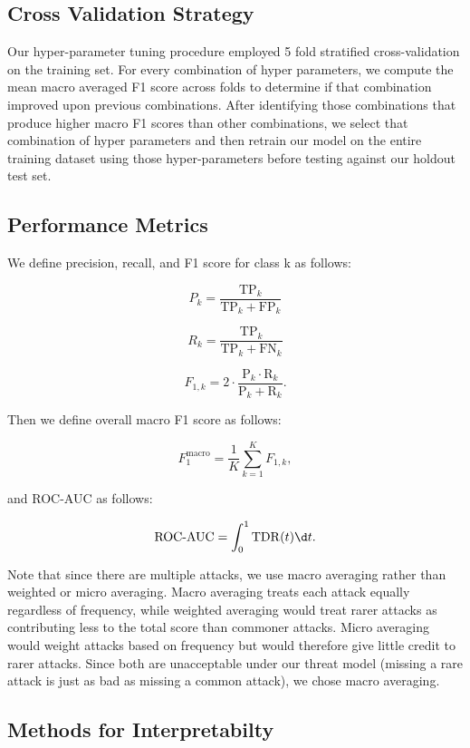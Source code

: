 \subsection{Cross Validation Strategy}

Our hyper-parameter tuning procedure employed 5 fold stratified cross-validation on the training set. For every combination of hyper parameters, we compute the mean macro averaged F1 score across folds to determine if that combination improved upon previous combinations. After identifying those combinations that produce higher macro F1 scores than other combinations, we select that combination of hyper parameters and then retrain our model on the entire training dataset using those hyper-parameters before testing against our holdout test set.

\subsection{Performance Metrics}

We define precision, recall, and F1 score for class k as follows:

$$ P_k = \frac{\mathrm{TP}_k}{\mathrm{TP}_k+\mathrm{FP}_k} $$

$$ R_k = \frac{\mathrm{TP}_k}{\mathrm{TP}_k+\mathrm{FN}_k} $$

$$ F_{1,k}= 2\cdot \frac{\mathrm{P}_k \cdot \mathrm{R}_k}{\mathrm{P}_k + \mathrm{R}_k}. $$

Then we define overall macro F1 score as follows:

$$ F_1^\mathrm{{macro}} = \frac{1}{K}\sum_{k=1}^KF_{1,k}, $$

and ROC-AUC as follows:

$$ \mathrm{ROC\text{-}AUC} = \int_0^1 \mathrm{TDR}(t)\d t. $$

Note that since there are multiple attacks, we use macro averaging rather than weighted or micro averaging. Macro averaging treats each attack equally regardless of frequency, while weighted averaging would treat rarer attacks as contributing less to the total score than commoner attacks. Micro averaging would weight attacks based on frequency but would therefore give little credit to rarer attacks. Since both are unacceptable under our threat model (missing a rare attack is just as bad as missing a common attack), we chose macro averaging.

\subsection{Methods for Interpretabilty}


